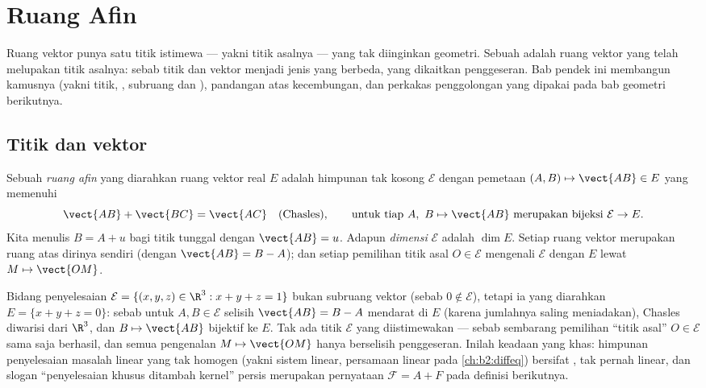 \chapter{Ruang Afin}\label{ch:b2:affine}

Ruang vektor punya satu titik istimewa --- yakni titik asalnya --- yang
tak diinginkan geometri. Sebuah \emph{} adalah ruang vektor
yang telah melupakan titik asalnya: sebab titik dan vektor menjadi jenis
yang berbeda, yang dikaitkan penggeseran. Bab pendek ini membangun
kamusnya (yakni titik, , subruang dan ), pandangan
 atas kecembungan, dan perkakas penggolongan yang dipakai pada
bab geometri berikutnya.

\section{Titik dan vektor}

\begin{definition}\label{def:b2:affine:def}
Sebuah \emph{ruang afin} yang diarahkan ruang
vektor real $E$ adalah himpunan tak kosong $\mathcal{E}$ dengan pemetaan
$(A, B) \mapsto \vect{AB} \in E$ yang memenuhi
\[
\vect{AB} + \vect{BC} = \vect{AC}
\quad \text{(Chasles)},
\qquad
\text{untuk tiap } A,\ B \mapsto \vect{AB} \text{ merupakan bijeksi }
\mathcal{E} \to E .
\]
Kita menulis $B = A + u$ bagi titik tunggal dengan $\vect{AB} = u$.
Adapun \emph{dimensi} $\mathcal{E}$ adalah $\dim E$. Setiap ruang
vektor merupakan ruang  atas dirinya sendiri (dengan $\vect{AB} = B - A$); dan setiap
pemilihan titik asal $O \in \mathcal{E}$ mengenali $\mathcal{E}$ dengan
$E$ lewat $M \mapsto \vect{OM}$.
\end{definition}

\begin{example}\label{ex:b2:affine:planeexample}
Bidang penyelesaian $\mathcal E = \{(x, y, z) \in \R^3 : x + y
+ z = 1\}$ bukan subruang vektor (sebab $0 \notin \mathcal E$),
tetapi ia  yang diarahkan $E = \{x + y + z =
0\}$: sebab untuk $A, B \in \mathcal E$ selisih $\vect{AB} = B
- A$ mendarat di $E$ (karena jumlahnya saling meniadakan), Chasles diwarisi
dari $\R^3$, dan $B \mapsto \vect{AB}$ bijektif ke $E$.
Tak ada titik $\mathcal E$ yang diistimewakan --- sebab sembarang pemilihan
``titik asal'' $O \in \mathcal E$ sama saja berhasil, dan semua
pengenalan $M \mapsto \vect{OM}$ hanya berselisih penggeseran.
Inilah keadaan yang khas: himpunan penyelesaian masalah
linear yang tak homogen (yakni sistem linear, persamaan 
linear pada \cref{ch:b2:diffeq}) bersifat , tak pernah linear,
dan slogan ``penyelesaian khusus ditambah kernel'' persis merupakan
pernyataan $\mathcal F = A + F$ pada definisi berikutnya.
\end{example}

